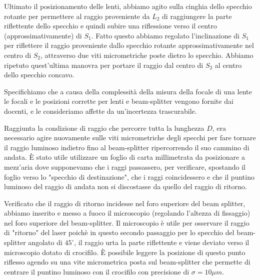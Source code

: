 \documentclass{article}
\begin{document}
\vspace{3mm}

Ultimato il posizionamento delle lenti, abbiamo agito sulla cinghia dello specchio rotante per permettere al raggio proveniente da $L_2$ di raggiungere la parte riflettente 
dello specchio e quindi subire una riflessione verso il centro (approssimativamente) di $S_1$.
Fatto questo abbiamo regolato l'inclinazione di $S_1$ per riflettere il raggio proveniente dallo specchio rotante approssimativamente nel centro di $S_2$, attraverso due
viti micrometriche poste dietro lo specchio. Abbiamo ripetuto quest'ultima manovra per portare il raggio dal centro di $S_2$ al centro dello specchio concavo.

Specifichiamo che a causa della complessità della misura della focale di una lente le focali e le posizioni corrette per lenti e beam-splitter vengono fornite dai 
docenti, e le consideriamo affette da un'incertezza trascurabile.

\vspace{3mm}

Raggiunta la condizione di raggio che percorre tutta la lunghezza $D$, era necessario agire nuovamente sulle viti micrometriche degli specchi per fare tornare il raggio
luminoso indietro fino al beam-splitter ripercorrendo il suo cammino di andata. È stato utile utilizzare un foglio di carta millimetrata da posizionare
a mezz'aria dove supponevamo che i raggi passassero, per verificare, spostando il foglio verso lo "specchio di destinazione", che i raggi coincidessero e che il puntino luminoso
del raggio di andata non si discostasse da quello del raggio di ritorno.

\vspace{3mm}

Verificato che il raggio di ritorno incidesse nel foro superiore del beam splitter, abbiamo inserito e messo a fuoco il microscopio (regolando l'altezza di fissaggio) nel
foro superiore del beam-splitter. Il microscopio è utile per osservare il raggio di "ritorno" del laser poichè in questo secondo passaggio per lo specchio del beam-splitter
angolato di $45^\circ$, il raggio urta la parte riflettente e viene deviato verso il microscopio dotato di crocifilo. È possibile leggere la posizione di questo punto 
riflesso agendo su una vite micrometrica posta sul beam-splitter che permette di centrare il puntino luminoso con il crocifilo con precisione di $\sigma = 10 \mu m$.

\vspace{3mm}
\end{document}
